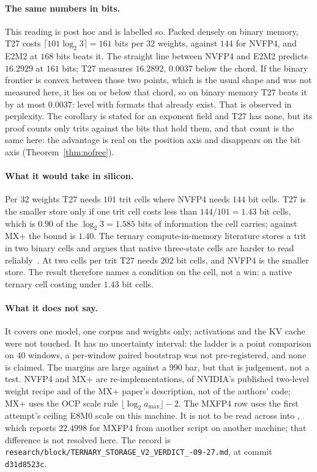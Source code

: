 \paragraph{The same numbers in bits.} This reading is post hoc and is labelled
so. Packed densely on binary memory, T27 costs $\lceil 101\log_2 3\rceil=161$ bits per $32$
weights, against $144$ for NVFP4, and E2M2 at $168$ bits beats it. The straight line between
NVFP4 and E2M2 predicts $16.2929$ at $161$ bits; T27 measures $16.2892$, $0.0037$ below the
chord. If the binary frontier is convex between those two points, which is the usual shape and
was not measured here, it lies on or below that chord, so on binary memory T27 beats it by at
most $0.0037$: level with formats that already exist. That is 
observed in perplexity. The corollary is stated for an exponent field and T27 has none, but its
proof counts only trits against the bits that hold them, and that count is the same here: the
advantage is real on the position axis and disappears on the bit axis (Theorem~\ref{thm:nofree}).

\paragraph{What it would take in silicon.} Per $32$ weights T27 needs $101$ trit
cells where NVFP4 needs $144$ bit cells. T27 is the smaller store only if one
trit cell costs less than $144/101=1.43$ bit cells, which is $0.90$ of the
$\log_2 3=1.585$ bits of information the cell carries; against MX+ the bound is
$1.40$. The ternary compute-in-memory literature stores a trit in two binary
cells and argues that native three-state cells are harder to read
reliably~\cite{retern}. At two cells per trit T27 needs $202$ bit cells, and
NVFP4 is the smaller store. The result therefore names a condition on the cell,
not a win: a native ternary cell costing under $1.43$ bit cells.

\paragraph{What it does not say.} It covers one model, one corpus and weights
only; activations and the KV cache were not touched. It has no uncertainty
interval: the ladder is a point comparison on $40$ windows, a per-window paired
bootstrap was not pre-registered, and none is claimed. The margins are large
against a $990$ bar, but that is judgement, not a test. NVFP4 and MX+ are
re-implementations, of NVIDIA's published two-level weight recipe and of the
MX+ paper's description, not of the authors' code; MX+ uses the OCP scale rule
$\lfloor\log_2 a_{\max}\rfloor-2$. The MXFP4 row uses the first attempt's
ceiling E8M0 scale on this machine. It is not to be read across into
, which reports $22.4998$ for MXFP4 from another
script on another machine; that difference is not resolved here. The record
is \texttt{research/\allowbreak block/\allowbreak TERNARY\_\allowbreak STORAGE\_\allowbreak V2\_\allowbreak VERDICT\_-09-27.md}, at
commit \texttt{d31d8523c}.



